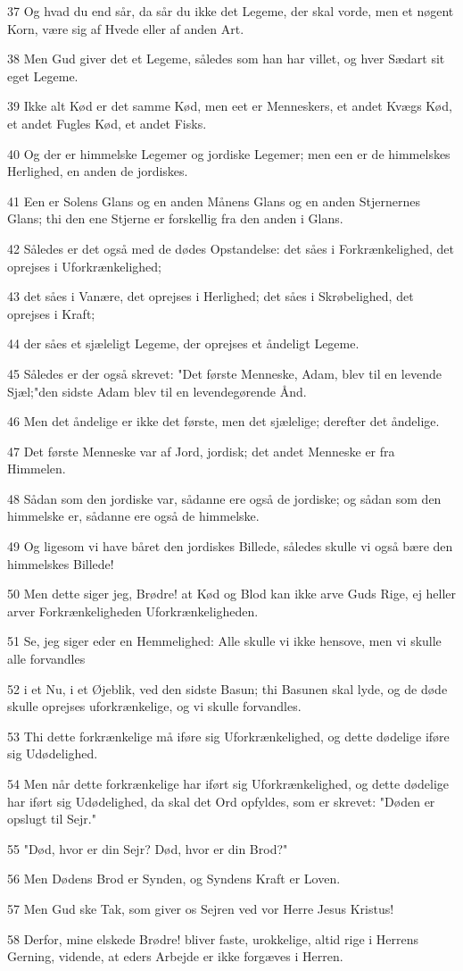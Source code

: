 \par 37 Og hvad du end sår, da sår du ikke det Legeme, der skal vorde, men et nøgent Korn, være sig af Hvede eller af anden Art.
\par 38 Men Gud giver det et Legeme, således som han har villet, og hver Sædart sit eget Legeme.
\par 39 Ikke alt Kød er det samme Kød, men eet er Menneskers, et andet Kvægs Kød, et andet Fugles Kød, et andet Fisks.
\par 40 Og der er himmelske Legemer og jordiske Legemer; men een er de himmelskes Herlighed, en anden de jordiskes.
\par 41 Een er Solens Glans og en anden Månens Glans og en anden Stjernernes Glans; thi den ene Stjerne er forskellig fra den anden i Glans.
\par 42 Således er det også med de dødes Opstandelse: det såes i Forkrænkelighed, det oprejses i Uforkrænkelighed;
\par 43 det såes i Vanære, det oprejses i Herlighed; det såes i Skrøbelighed, det oprejses i Kraft;
\par 44 der såes et sjæleligt Legeme, der oprejses et åndeligt Legeme.
\par 45 Således er der også skrevet: "Det første Menneske, Adam, blev til en levende Sjæl;"den sidste Adam blev til en levendegørende Ånd.
\par 46 Men det åndelige er ikke det første, men det sjælelige; derefter det åndelige.
\par 47 Det første Menneske var af Jord, jordisk; det andet Menneske er fra Himmelen.
\par 48 Sådan som den jordiske var, sådanne ere også de jordiske; og sådan som den himmelske er, sådanne ere også de himmelske.
\par 49 Og ligesom vi have båret den jordiskes Billede, således skulle vi også bære den himmelskes Billede!
\par 50 Men dette siger jeg, Brødre! at Kød og Blod kan ikke arve Guds Rige, ej heller arver Forkrænkeligheden Uforkrænkeligheden.
\par 51 Se, jeg siger eder en Hemmelighed: Alle skulle vi ikke hensove, men vi skulle alle forvandles
\par 52 i et Nu, i et Øjeblik, ved den sidste Basun; thi Basunen skal lyde, og de døde skulle oprejses uforkrænkelige, og vi skulle forvandles.
\par 53 Thi dette forkrænkelige må iføre sig Uforkrænkelighed, og dette dødelige iføre sig Udødelighed.
\par 54 Men når dette forkrænkelige har iført sig Uforkrænkelighed, og dette dødelige har iført sig Udødelighed, da skal det Ord opfyldes, som er skrevet: "Døden er opslugt til Sejr."
\par 55 "Død, hvor er din Sejr? Død, hvor er din Brod?"
\par 56 Men Dødens Brod er Synden, og Syndens Kraft er Loven.
\par 57 Men Gud ske Tak, som giver os Sejren ved vor Herre Jesus Kristus!
\par 58 Derfor, mine elskede Brødre! bliver faste, urokkelige, altid rige i Herrens Gerning, vidende, at eders Arbejde er ikke forgæves i Herren.

